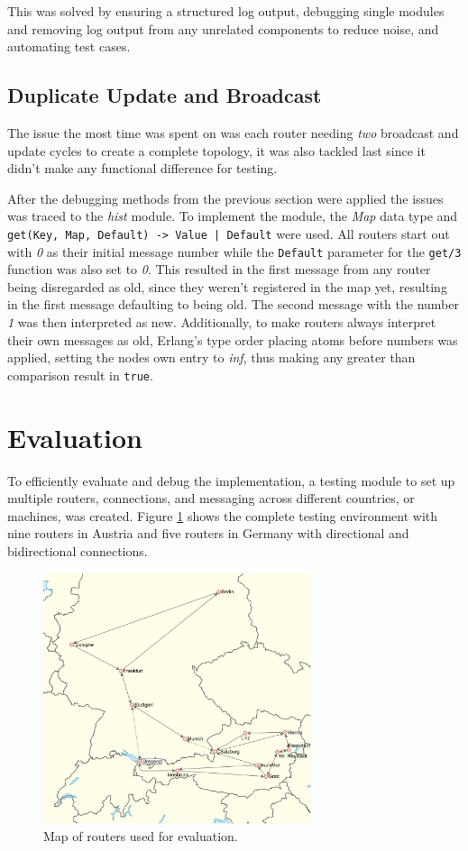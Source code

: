 \documentclass[a4paper, 11pt]{article}
\begin{document}
This was solved by ensuring a structured log output, debugging single modules and removing log output from any unrelated components to reduce noise, and automating test cases.

\subsection{Duplicate Update and Broadcast}

The issue the most time was spent on was each router needing \textit{two} broadcast and update cycles to create a complete topology, it was also tackled last since it didn't make any functional difference for testing.

After the debugging methods from the previous section were applied the issues was traced to the \textit{hist} module.
To implement the module, the \textit{Map} data type and \texttt{get(Key, Map, Default) -> Value | Default} were used.
All routers start out with \textit{0} as their initial message number while the \texttt{Default} parameter for the \texttt{get/3} function was also set to \textit{0}.
This resulted in the first message from any router being disregarded as old, since they weren't registered in the map yet, resulting in the first message defaulting to being old. The second message with the number \textit{1} was then interpreted as new.
Additionally, to make routers always interpret their own messages as old, Erlang's type order placing atoms before numbers was applied, setting the nodes own entry to \textit{inf}, thus making any greater than comparison result in \texttt{true}.

\section{Evaluation}

To efficiently evaluate and debug the implementation, a testing module to set up multiple routers, connections, and messaging across different countries, or machines, was created.
Figure \ref{fig:map1} shows the complete testing environment with nine routers in Austria and five routers in Germany with directional and bidirectional connections.

\begin{figure}[H]
  \begin{center}
    \includegraphics[width=300px]{graphics/map_routy.pdf}
    \caption{Map of routers used for evaluation.}
    \label{fig:map1}
  \end{center}
\end{figure}
\end{document}
